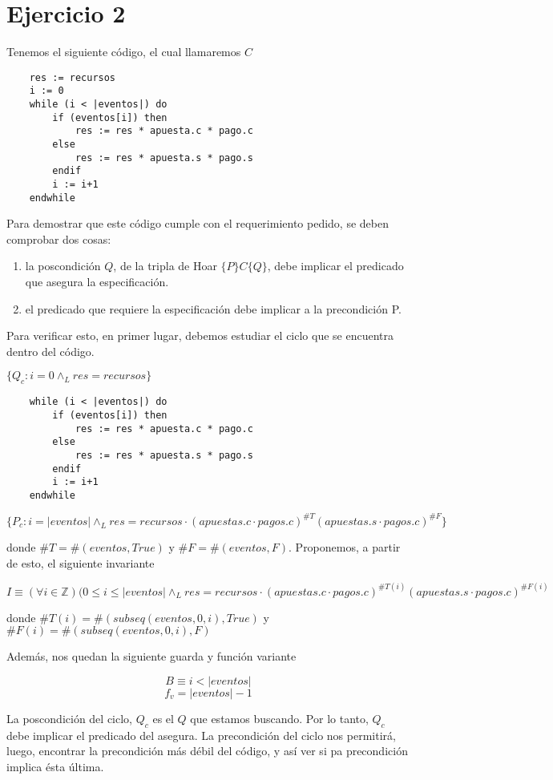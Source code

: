 \documentclass[document.tex]{subfiles}
\begin{document}
\section{Ejercicio 2}

Tenemos el siguiente código, el cual llamaremos $C$
\begin{verbatim}
    res := recursos
    i := 0
    while (i < |eventos|) do
        if (eventos[i]) then
            res := res * apuesta.c * pago.c
        else
            res := res * apuesta.s * pago.s
        endif
        i := i+1
    endwhile
\end{verbatim}

Para demostrar que este código cumple con el requerimiento pedido, se deben comprobar dos cosas:

\begin{enumerate}
    \item la poscondición $Q$, de la tripla de Hoar $\{P\}C\{Q\}$, debe implicar el predicado que asegura la especificación.
    \item el predicado que requiere la especificación debe implicar a la precondición {P}.
\end{enumerate}

Para verificar esto, en primer lugar, debemos estudiar el ciclo que se encuentra dentro del código.

$\{Q_c: i = 0 \land_{L} res = recursos\}$
\begin{verbatim}
    while (i < |eventos|) do
        if (eventos[i]) then
            res := res * apuesta.c * pago.c
        else
            res := res * apuesta.s * pago.s
        endif
        i := i+1
    endwhile
\end{verbatim}
$\{P_c: i = |eventos| \land_{L} res = recursos \cdot (apuestas.c\cdot pagos.c)^{\#T}(apuestas.s\cdot pagos.c)^{\#F}\}$

donde $\#T = \#(eventos, True)$ y $\#F = \#(eventos, F)$. Proponemos, a partir de esto, el siguiente invariante

$$I \equiv (\forall i \in \mathbb{Z})(0\leq i \leq |eventos| \land_L res = recursos \cdot (apuestas.c\cdot pagos.c)^{\#T(i)}(apuestas.s\cdot pagos.c)^{\#F(i)}$$

donde $\#T(i) = \#(subseq(eventos,0,i), True)$ y $\#F(i) = \#(subseq(eventos,0,i), F)$

Además, nos quedan la siguiente guarda y función variante

$$B \equiv i < |eventos|$$
$$f_v = |eventos|-1$$

La poscondición del ciclo, $Q_c$ es el $Q$ que estamos buscando. Por lo tanto, $Q_c$ debe implicar el predicado del asegura. La precondición del ciclo nos permitirá, luego, encontrar la precondición más débil del código, y así ver si pa precondición implica ésta última.
\end{document}
